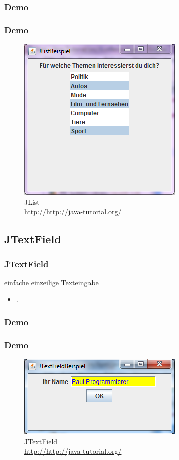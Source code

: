 \documentclass[xcolor=dvipsnames]{beamer}
\begin{document}
\subsubsection{Demo}
\begin{frame}
  \frametitle{Demo}
	\begin{figure}
		\includegraphics[scale=0.8]{images/jlist.PNG}
		\caption{JList \\ \tiny{\textcolor{gray}{\url{http://http://java-tutorial.org/}}}}
		\end{figure}
\end{frame}



\subsection{JTextField}
\begin{frame} %
  \frametitle{JTextField
} %
  \begin{block}{einfache einzeilige Texteingabe}
	  \begin{itemize}
		\item .
	  \end{itemize}
  \end{block}
\end{frame}


\subsubsection{Demo}
\begin{frame}
  \frametitle{Demo}
	\begin{figure}
		\includegraphics[scale=0.8]{images/jtextfield.PNG}
		\caption{JTextField \\ \tiny{\textcolor{gray}{\url{http://http://java-tutorial.org/}}}}
		\end{figure}
\end{frame}
\end{document}
